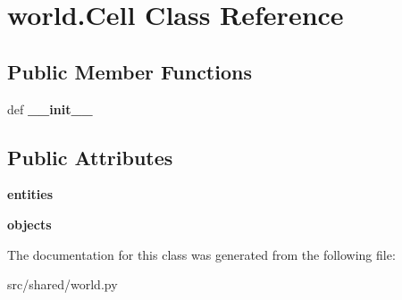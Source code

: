 \hypertarget{classworld_1_1_cell}{\section{world.\-Cell \-Class \-Reference}
\label{classworld_1_1_cell}
}
\subsection*{\-Public \-Member \-Functions}
\begin{DoxyCompactItemize}
\item 
\hypertarget{classworld_1_1_cell_a3dd387b6af13f7450acb97fb40c13a0e}{def {\bfseries \-\_\-\-\_\-init\-\_\-\-\_\-}}\label{classworld_1_1_cell_a3dd387b6af13f7450acb97fb40c13a0e}

\end{DoxyCompactItemize}
\subsection*{\-Public \-Attributes}
\begin{DoxyCompactItemize}
\item 
\hypertarget{classworld_1_1_cell_abacc61990c80c148f496f72be2f43dc6}{{\bfseries entities}}\label{classworld_1_1_cell_abacc61990c80c148f496f72be2f43dc6}

\item 
\hypertarget{classworld_1_1_cell_afd921144822811cc4c904bd1f0f3f746}{{\bfseries objects}}\label{classworld_1_1_cell_afd921144822811cc4c904bd1f0f3f746}

\end{DoxyCompactItemize}


\-The documentation for this class was generated from the following file\-:\begin{DoxyCompactItemize}
\item 
src/shared/world.\-py\end{DoxyCompactItemize}
